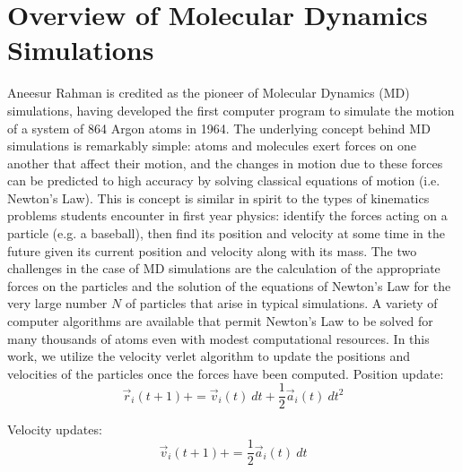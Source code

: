\documentclass[journal=jpclcd,manuscript=article]{achemso}
\begin{document}
\section{Overview of Molecular Dynamics Simulations}
Aneesur Rahman is credited as the pioneer of Molecular Dynamics (MD) simulations, having developed the first computer
program to simulate the motion of a system of 864 Argon atoms in 1964.%
The underlying concept behind MD simulations is remarkably simple:  atoms and molecules exert forces on one another that affect their motion,
and the changes in motion due to these forces can be predicted to high accuracy by solving classical equations of motion (i.e. Newton's Law).
This is concept is similar in spirit to the types of kinematics problems students encounter in first year physics: identify
the forces acting on a particle (e.g. a baseball), then find its position and velocity at some time in the future given its current
position and velocity along with its mass.  
The two challenges in the case of MD simulations are the calculation of the appropriate forces on the particles and the 
solution of the equations of
Newton's Law for the very large number $N$ of particles that arise in typical simulations.  A variety of computer algorithms are
available that permit Newton's Law to be solved for many thousands of atoms even with modest computational resources.
In this work, we utilize the velocity verlet algorithm to update the positions and velocities of
the particles once the forces have been computed.     
Position update:
\begin{equation}
\vec{r}_{i}(t+1) += \vec{v}_i(t) \: dt + \frac{1}{2} \vec{a}_i(t) \: dt^2 
\end{equation}

Velocity updates:
\begin{equation}
\vec{v}_i (t+1) += \frac{1}{2} \vec{a}_i(t) \: dt
\end{equation}
\end{document}
